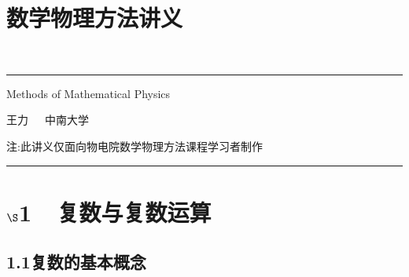 \documentclass[UTF8]{ctexart}
\begin{document}
	\section*{数学物理方法讲义}

	~

	\hrule
	\begin{center}
		\noindent
		Methods of Mathematical Physics

		王力~~~中南大学
		
		注:此讲义仅面向物电院数学物理方法课程学习者制作

	\end{center}
	\hrule



	\section*{$\S$1~~复数与复数运算}

	\subsection*{1.1复数的基本概念}
\end{document}
